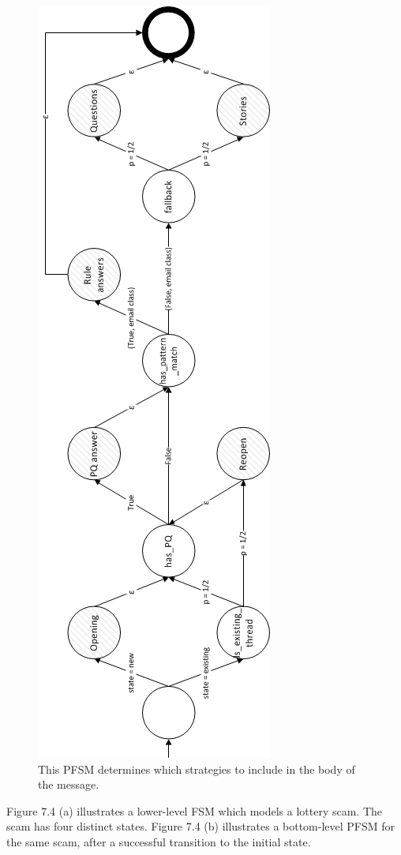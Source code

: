\begin{figure}
\centering
\includegraphics{pics/body-fsm-left.png}
\caption{This PFSM determines which strategies to include in the body of the message.}
\end{figure}

Figure 7.4 (a) illustrates a lower-level FSM which models a lottery scam. The scam has four distinct states. Figure 7.4 (b) illustrates a bottom-level PFSM for the same scam, after a successful transition to the initial state.

